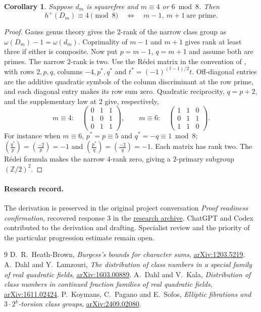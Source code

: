 \documentclass[11pt]{article}
\newtheorem{corollary}[theorem]{Corollary}
\newcommand{\leg}[2]{\left(\frac{#1}{#2}\right)}
\begin{document}
\begin{corollary}
Suppose $d_m$ is squarefree and $m\equiv4$ or $6\bmod8$. Then
\[
 h^+(D_m)\equiv4\pmod8\quad\Longleftrightarrow\quad
 m-1,\ m+1\ \text{are prime}.
\]
\end{corollary}
\begin{proof}
Gauss genus theory gives the $2$-rank of the narrow class group as
$\omega(D_m)-1=\omega(d_m)$. Coprimality of $m-1$ and $m+1$ gives
rank at least three if either is composite. Now put $p=m-1$,
$q=m+1$ and assume both are primes. The narrow $2$-rank is two.
Use the R\'edei matrix in the convention of \cite[Thm.~2.2]{KPS},
with rows $2,p,q$, columns $-4,p^*,q^*$ and
$t^*=(-1)^{(t-1)/2}t$. Off-diagonal entries are the additive
quadratic symbols of the column discriminant at the row prime, and
each diagonal entry makes its row sum zero. Quadratic reciprocity,
$q=p+2$, and the supplementary law at $2$ give, respectively,
\[
 m\equiv4:\quad
 \begin{pmatrix}0&1&1\\1&0&1\\0&1&1\end{pmatrix},
 \qquad
 m\equiv6:\quad
 \begin{pmatrix}1&1&0\\0&1&1\\1&1&0\end{pmatrix}.
\]
For instance when $m\equiv6$, $p^*=p\equiv5$ and
$q^*=-q\equiv1\bmod8$; $\leg{q^*}{p}=\leg{-2}{p}=-1$
and $\leg{p^*}{q}=\leg{-2}{q}=-1$.
Each matrix has rank two. The R\'edei formula makes the narrow
$4$-rank zero, giving a $2$-primary subgroup $(\mathbb Z/2)^2$.
\end{proof}

\paragraph{Research record.}
The derivation is preserved in the original project conversation
\emph{Proof readiness confirmation}, recovered response 3 in the
\href{https://github.com/cosmosgeek0/Twin-Prime/blob/main/history/hosted-research-responses-2026-11-25.md}{research archive}.
ChatGPT and Codex contributed to the derivation and drafting.
Specialist review and the priority of the particular progression
estimate remain open.

\begin{thebibliography}{9}
 D.~R.~Heath-Brown, \emph{Burgess's bounds for character sums},
\href{https://arxiv.org/abs/1203.5219}{arXiv:1203.5219}.
 A.~Dahl and Y.~Lamzouri, \emph{The distribution of class
numbers in a special family of real quadratic fields},
\href{https://arxiv.org/abs/1603.00889}{arXiv:1603.00889}.
 A.~Dahl and V.~Kala, \emph{Distribution of class numbers in
continued fraction families of real quadratic fields},
\href{https://arxiv.org/abs/1611.02424}{arXiv:1611.02424}.
 P.~Koymans, C.~Pagano and E.~Sofos,
\emph{Elliptic fibrations and $3\cdot2^k$-torsion class groups},
\href{https://arxiv.org/abs/2409.02080}{arXiv:2409.02080}.
\end{thebibliography}
\end{document}
